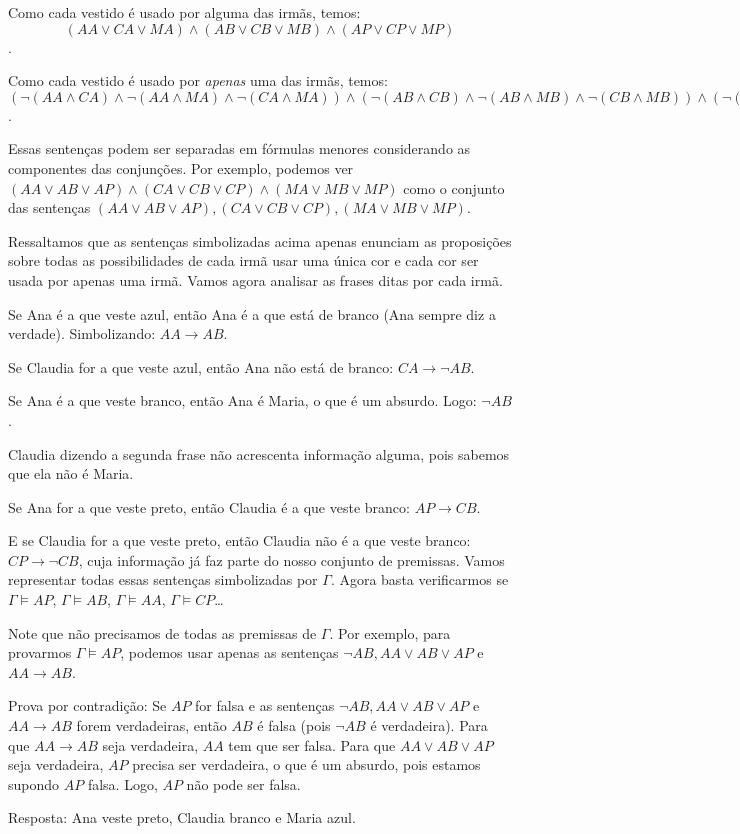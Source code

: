 \documentclass[answers]{exam}
\begin{document}
Como cada vestido \'e usado por alguma das irm\~as, temos:
\[
(AA\lor CA \lor MA)\land(AB\lor CB \lor MB)\land(AP\lor CP \lor MP)
\].

Como cada vestido \'e usado por \textit{apenas} uma das irm\~as, temos:
$(\neg (AA\land CA)\land \neg (AA\land MA) \land \neg (CA\land MA)) \land
(\neg (AB\land CB)\land \neg (AB\land MB) \land \neg (CB\land MB)) \land
(\neg (AP\land CP)\land \neg (AP\land MP) \land \neg (CP\land
MP))$. 

Essas senten\c{c}as podem ser separadas em f\'ormulas menores
considerando as componentes das conjun\c{c}\~oes.  Por exemplo,
podemos ver $(AA\lor AB\lor AP)\land(CA\lor CB\lor CP)\land(MA\lor
MB\lor MP)$ como o conjunto das senten\c{c}as $(AA\lor AB\lor AP),
(CA\lor CB\lor CP), (MA\lor MB\lor MP)$.

Ressaltamos que as senten\c{c}as simbolizadas acima apenas enunciam as
proposi\c{c}\~oes sobre todas as possibilidades de cada irm\~a usar
uma \'unica cor e cada cor ser usada por apenas uma irm\~a.  Vamos
agora analisar as frases ditas por cada irm\~a.

Se Ana \'e a que veste azul, ent\~ao Ana \'e a que est\'a de branco
(Ana sempre diz a verdade). Simbolizando: $AA\rightarrow AB$. 

Se Claudia for a que veste azul, ent\~ao Ana n\~ao est\'a de branco:
$CA\rightarrow \neg AB$. 

Se Ana \'e a que veste branco, ent\~ao Ana \'e Maria, o que \'e um
absurdo. Logo: $\neg AB$. 

Claudia dizendo a segunda frase n\~ao acrescenta informa\c{c}\~ao
alguma, pois sabemos que ela n\~ao \'e Maria.

Se Ana for a que veste preto, ent\~ao Claudia \'e a que veste branco:
$AP\rightarrow CB$. 

E se Claudia for a que veste preto, ent\~ao Claudia n\~ao \'e a que
veste branco: $CP\rightarrow \neg CB$, cuja informa\c{c}\~ao j\'a faz
parte do nosso conjunto de premissas.  Vamos representar todas essas
senten\c{c}as simbolizadas por $\Gamma$.  Agora basta verificarmos se
$\Gamma\models AP$, $\Gamma\models AB$, $\Gamma\models AA$,
$\Gamma\models CP$\ldots

Note que n\~ao precisamos de todas as premissas de $\Gamma$. Por
exemplo, para provarmos $\Gamma\models AP$, podemos usar apenas as
senten\c{c}as $\neg AB, AA\lor AB\lor AP$ e $AA\rightarrow AB$.

Prova por contradi\c{c}\~ao: Se $AP$ for falsa e as senten\c{c}as
$\neg AB, AA\lor AB\lor AP$ e $AA\rightarrow AB$ forem verdadeiras,
ent\~ao $AB$ \'e falsa (pois $\neg AB$ \'e verdadeira). Para que
$AA\rightarrow AB$ seja verdadeira, $AA$ tem que ser falsa.  Para que
$AA\lor AB\lor AP$ seja verdadeira, $AP$ precisa ser verdadeira, o que
\'e um absurdo, pois estamos supondo $AP$ falsa.  Logo, $AP$ n\~ao
pode ser falsa.

Resposta: Ana veste preto, Claudia branco e Maria azul.
\end{document}

